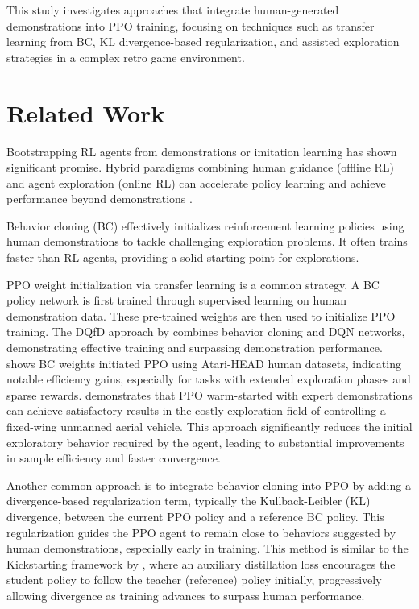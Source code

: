 \documentclass{article}
\begin{document}
This study investigates approaches that integrate human-generated 
demonstrations into PPO training, focusing on techniques such as transfer 
learning from BC, KL divergence-based regularization, and assisted exploration 
strategies in a complex retro game environment.

\section{Related Work}

Bootstrapping RL agents from demonstrations or imitation learning 
has shown significant promise. Hybrid paradigms combining human 
guidance (offline RL) and agent exploration (online RL) can 
accelerate policy learning and achieve performance beyond 
demonstrations \cite{hester_dqfd_2017, nair_bcrl_overcoming_2018, 
song_hybrid_2023, ren_hybrid_2024, Coletti2023EffectivenessOW}.

Behavior cloning (BC) effectively initializes reinforcement learning 
policies using human demonstrations to tackle challenging exploration 
problems. It often trains faster than RL agents, providing a solid 
starting point for explorations.

PPO weight initialization via transfer learning is a common strategy. A BC 
policy network is first trained through supervised learning on human 
demonstration data. These pre-trained weights are then used to 
initialize PPO training. The DQfD approach by \cite{hester_dqfd_2017} 
combines behavior cloning and DQN networks, demonstrating effective 
training and surpassing demonstration performance. 
\cite{laidlaw2024bridgingrltheorypractice} shows BC weights 
initiated PPO using Atari-HEAD human datasets, indicating notable 
efficiency gains, especially for tasks with extended exploration 
phases and sparse rewards. \cite{Coletti2023EffectivenessOW} 
demonstrates that PPO warm-started with expert demonstrations can 
achieve satisfactory results in the costly exploration field of 
controlling a fixed-wing unmanned aerial vehicle. This approach 
significantly reduces the initial exploratory behavior required by 
the agent, leading to substantial improvements in sample efficiency 
and faster convergence.

Another common approach is to integrate behavior cloning into PPO by 
adding a divergence-based regularization term, typically the 
Kullback-Leibler (KL) divergence, between the current PPO policy and 
a reference BC policy. This regularization guides the PPO agent to 
remain close to behaviors suggested by human demonstrations, 
especially early in training. This method is similar to the 
Kickstarting framework by \cite{schmitt2018kickstartingdeepreinforcementlearning}, 
where an auxiliary distillation loss encourages the student policy to 
follow the teacher (reference) policy initially, progressively 
allowing divergence as training advances to surpass human performance.
\end{document}
